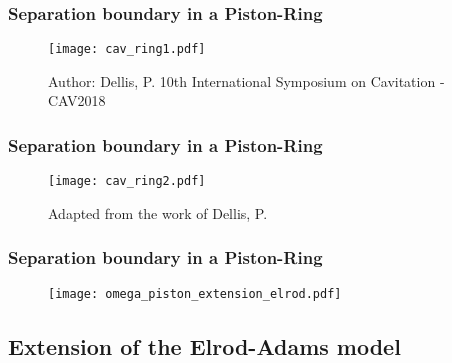 \documentclass[10pt,aspectratio=169]{beamer}
\begin{document}
\begin{frame}
\frametitle{Separation boundary in a Piston-Ring}
\vspace*{1.0cm}
\begin{figure}
	\centering
	\texttt{[image: cav\_ring1.pdf]}
	\caption{\color{ExecusharesGrey}\tiny Author: Dellis, P. 10th International Symposium on Cavitation - CAV2018}
\end{figure}
\end{frame}

\begin{frame}[noframenumbering]
\frametitle{Separation boundary in a Piston-Ring}
\vspace*{1.0cm}
\begin{figure}
	\centering
	\texttt{[image: cav\_ring2.pdf]}
		\caption{\color{ExecusharesGrey}\tiny Adapted from the work of Dellis, P.}
\end{figure}
\end{frame}

\begin{frame}
\frametitle{Separation boundary in a Piston-Ring}
\vspace*{1.0cm}
\begin{figure}
	\centering
	\texttt{[image: omega\_piston\_extension\_elrod.pdf]}
\end{figure}
\end{frame}

\setcounter{showSlideNumbers}{0}
\subsection{Extension of the Elrod-Adams model}
\begin{frame}[noframenumbering]
\tableofcontents[
currentsection,
currentsubsection,
subsectionstyle=show/shaded/hide
]
\end{frame}
\setcounter{showSlideNumbers}{1}
\end{document}

